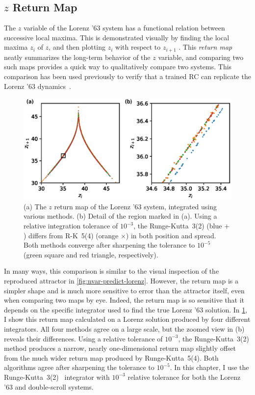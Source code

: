 \subsection{$z$ Return Map}

The $z$ variable of the Lorenz '63 system has a functional relation
between successive local maxima. This is demonstrated visually by
finding the local maxima $z_i$ of $z$, and then plotting $z_i$ with
respect to $z_{i+1}$ \cite{lorenz1963}. This \emph{return map} neatly
summarizes the long-term behavior of the $z$ variable, and comparing
two such maps provides a quick way to qualitatively compare two
systems. This comparison has been used previously to verify that a
trained RC can replicate the Lorenz '63 dynamics~\cite{pathak2017}.

\begin{figure}
  \includegraphics{figures/lorenz-rmap-tol}
  \caption{(a) The $z$ return map of the Lorenz '63 system, integrated
    using various methods. (b) Detail of the region marked in
    (a). Using a relative integration tolerance of $10^{-3}$, the
    Runge-Kutta~3(2) (blue $+$) differs from R-K~5(4) (orange
    $\times$) in both position and spread. Both methods converge after
    sharpening the tolerance to $10^{-5}$ (green square and red
    triangle, respectively).}
  \label{fig:lorenz-rmap-tol}
\end{figure}

In many ways, this comparison is similar to the visual inspection of
the reproduced attractor in \cref{fig:nvar-predict-lorenz}. However,
the return map is a simpler shape and is much more sensitive to error
than the attractor itself, even when comparing two maps by
eye. Indeed, the return map is so sensitive that it depends on the
specific integrator used to find the true Lorenz '63 solution. In
\cref{fig:lorenz-rmap-tol}, I show this return map calculated on a
Lorenz solution produced by four different integrators. All four
methods agree on a large scale, but the zoomed view in (b) reveals
their differences. Using a relative tolerance of $10^{-3}$, the
Runge-Kutta~3(2) method produces a narrow, nearly one-dimensional
return map slightly offset from the much wider return map produced by
Runge-Kutta~5(4). Both algorithms agree after sharpening the tolerance
to $10^{-5}$.  In this chapter, I use the
Runge-Kutta~3(2)~\cite{dormand1980} integrator with $10^{-3}$ relative
tolerance for both the Lorenz '63 and double-scroll systems.


